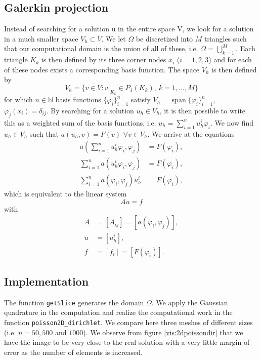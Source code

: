 \documentclass{report}
\DeclareMathOperator{\spn}{span}
\def\N{\mathbb{N}}
\begin{document}
\subsection{Galerkin projection}

Instead of searching for a solution u in the entire space V, we look for a solution in a much smaller space $V_h \subset V$. We let $\Omega$ be discretized into $M$ triangles such that our computational
domain is the union of all of these, i.e. $\Omega = \bigcup_{k=1}^M$. Each triangle $K_k$ is then defined by its three corner nodes $x_i$ ($i=1,2,3$) and for each of these nodes exists a corresponding basis function. The space $V_h$ is then defined by
\begin{equation}
	V_h = \{ v \in V: v|_{K_k} \in P_1 (K_k),\ k  = 1,...,M\}
\end{equation}
for which $n \in \N$ basis functions $\{\varphi_i\}_{i=1}^n $ satisfy $V_h = \spn\{\varphi_i\}_{i=1}^n$, $\varphi_j (x_i) = \delta_{ij}$. By searching for a solution $u_h \in V_h$, it is then possible to write this as a weighted sum of the basis functions, i.e. $u_h = \sum_{i=1}^n u_h^i \varphi_i$. We now find $u_h \in V_h$ such that $a(u_h , v) = F(v)$ $\forall v \in V_h$. We arrive at the equations
\begin{align}
	a\left(\sum_{i=1}^n u_h^i \varphi_i , \varphi_j\right) &= F (\varphi_i), \\
	\sum_{i=1}^n a(u_h^i \varphi_i , \varphi_j) &= F (\varphi_i), \\
	\sum_{i=1}^n a(\varphi_i , \varphi_j) u_h^i &= F (\varphi_i),
\end{align}
which is equivalent to the linear system
\begin{equation} \label{poissondirhomlinsys}
	Au = f
\end{equation}
with
\begin{align}
	A &= [A_{ij}] = [a(\varphi_i , \varphi_j)], \\
	u &= [u_h^i], \\
	f &= [f_i] = [F (\varphi_i)].
\end{align}

\subsection{Implementation}

The function \texttt{getSlice} generates the domain $\Omega$. We apply the Gaussian quadrature in the computation and realize the computational work in the function \texttt{poisson2D\_dirichlet}. We compare here three meshes of different sizes (i.e. $n= 50, 500$ and $1000$). We observe from figure \ref{vis:2dpoissondir} that we have the image to be very close to the real solution with a very little margin of error as the number of elements is increased.
\end{document}
